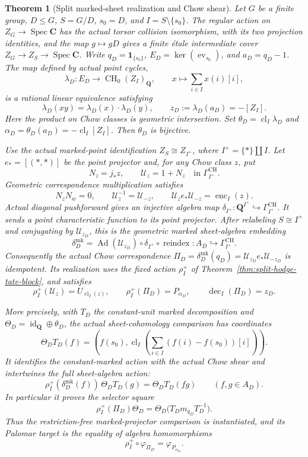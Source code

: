 \documentclass[11pt]{article}
\newtheorem{theorem}{Theorem}[section]
\theoremstyle{definition}
\theoremstyle{remark}
\DeclareMathOperator{\Spec}{Spec}
\DeclareMathOperator{\ev}{ev}
\DeclareMathOperator{\CH}{CH}
\newcommand{\Q}{\mathbf Q}
\newcommand{\one}{\mathbf 1}
\begin{document}
\begin{theorem}[Split marked-sheet realization and Chow shear]
\label{thm:split-galois-marked-comparison}
Let \(G\) be a finite group, \(D\leq G\), \(S=G/D\),
\(s_0=D\), and \(I=S\setminus\{s_0\}\).
The regular action on \(Z_G\to\Spec\mathbf C\) has the actual torsor
collision isomorphism, with its two projection identities, and the map
\(g\mapsto gD\) gives a finite \'etale intermediate cover
\(Z_G\to Z_S\to\Spec\mathbf C\).
Write \(q_D=\one_{\{s_0\}}\), \(E_D=\ker(\ev_{s_0})\), and
\(a_D=q_D-1\).  The map defined by actual point cycles,
\[
 \lambda_D:E_D\longrightarrow\CH_0(Z_I)_{\Q},
 \qquad x\longmapsto\sum_{i\in I}x(i)[i],
\]
is a rational linear equivalence satisfying
\[
 \lambda_D(xy)=\lambda_D(x)\cdot\lambda_D(y),
 \qquad z_D:=\lambda_D(a_D)=-[Z_I].
\]
Here the product on Chow classes is geometric intersection.
Set \(\theta_D=\operatorname{cl}_I\lambda_D\) and
\(\alpha_D=\theta_D(a_D)=-\operatorname{cl}_I[Z_I]\).
Then \(\theta_D\) is bijective.

Use the actual marked-point identification
\(Z_S\cong Z_{I^+}\), where \(I^+=\{*\}\amalg I\).
Let \(e_*=[(*,*)]\) be the point projector and, for any Chow class \(z\),
put
\[
 N_z=j_*z,\qquad \mathcal U_z=1+N_z
       \quad\text{in }\Gamma_{I^+}^{\mathrm{CH}}.
\]
Geometric correspondence multiplication satisfies
\[
 N_zN_w=0,\qquad
 \mathcal U_z^{-1}=\mathcal U_{-z},\qquad
 \mathcal U_z e_*\mathcal U_{-z}=\operatorname{enc}_I(z).
\]
Actual diagonal pushforward gives an injective algebra map
\(\delta_{I^+}:\Q^{I^+}\hookrightarrow\Gamma_{I^+}^{\mathrm{CH}}\).
It sends a point characteristic function to its point projector.
After relabeling \(S\cong I^+\) and conjugating by
\(\mathcal U_{z_D}\), this is the geometric marked sheet-algebra
embedding
\[
 \delta_D^{\mathrm{mk}}
  =\operatorname{Ad}(\mathcal U_{z_D})\circ
    \delta_{I^+}\circ\operatorname{reindex}
   :A_D\hookrightarrow\Gamma_{I^+}^{\mathrm{CH}}.
\]
Consequently the actual Chow correspondence
\(\Pi_D=\delta_D^{\mathrm{mk}}(q_D)
       =\mathcal U_{z_D}e_*\mathcal U_{-z_D}\) is idempotent.
Its realization uses the fixed action \(\rho_I^+\) of
Theorem~\ref{thm:split-hodge-tate-block}, and satisfies
\[
 \rho_I^+(\mathcal U_z)=U_{\operatorname{cl}_I(z)},\qquad
 \rho_I^+(\Pi_D)=P_{\alpha_D},\qquad
 \operatorname{dec}_I(\Pi_D)=z_D.
\]

More precisely, with \(T_D\) the constant-unit marked decomposition
and \(\Theta_D=\operatorname{id}_{\Q}\oplus\theta_D\), the actual
sheet-cohomology comparison has coordinates
\[
 \Theta_DT_D(f)=
 \left(f(s_0),\operatorname{cl}_I
       \left(\sum_{i\in I}(f(i)-f(s_0))[i]\right)\right).
\]
It identifies the constant-marked action with the actual Chow shear and
intertwines the full sheet-algebra action:
\[
 \rho_I^+(\delta_D^{\mathrm{mk}}(f))\,\Theta_DT_D(g)
      =\Theta_DT_D(fg)\qquad(f,g\in A_D).
\]
In particular it proves the selector square
\[
 \rho_I^+(\Pi_D)\Theta_D
   =\Theta_D\bigl(T_Dm_{q_D}T_D^{-1}\bigr).
\]
Thus the restriction-free marked-projector comparison is instantiated,
and its Palomar target is the equality of algebra homomorphisms
\[
 \rho_I^+\circ\varphi_{\Pi_D}=\varphi_{P_{\alpha_D}}.
\]
\end{theorem}
\end{document}
